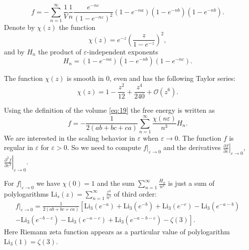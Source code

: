 \documentclass{article}
\newcommand{\Li}{\mathrm{Li}}
\begin{document}
\begin{equation}
  \label{eq:38}
  f=-\sum_{n=1}^{\infty}
  \frac{1}{V}\frac{1}{n}\frac{e^{-n\varepsilon}}{\left(1-e^{-n\varepsilon}\right)^{2}}
  \left(1-e^{-na}\right)\left(1-e^{-nb}\right)\left(1-e^{-nb}\right).
\end{equation}
Denote by $\chi(z)$ the function
\begin{equation}
  \label{eq:39}
  \chi(z)=e^{-z}\left(\frac{z}{1-e^{-z}}\right)^{2}, 
\end{equation}
and by $H_{n}$ the product of $\varepsilon$-independent exponents
\begin{equation}
  \label{eq:40}
  H_{n}=\left(1-e^{-na}\right)\left(1-e^{-nb}\right)\left(1-e^{-nc}\right).
\end{equation}

The function $\chi(z)$ is smooth in 0, even and has the following Taylor series:
\begin{equation}
  \label{eq:45}
  \chi(z)=1 - \frac{z^2}{12} + \frac{z^4}{240}+\mathcal{O}(z^{6}).
\end{equation}

Using the definition of the volume \eqref{eq:19} the free energy is written as
\begin{equation}
  \label{eq:41}
  f=-\frac{1}{2(ab+bc+ca)} \sum _{n=1}^{\infty} \frac{\chi(n\varepsilon)}{n^{3}} H_{n}.
\end{equation}
We are interested in the scaling behavior in $\varepsilon$ when $\varepsilon\to 0$. The function $f$
is regular in $\varepsilon$ for $\varepsilon>0$. So we need to
compute  $\left.f\right|_{\varepsilon\to 0}$ and the derivatives $\left.\frac{\partial f}{\partial
  \varepsilon}\right|_{\varepsilon\to 0}$, $\left.\frac{\partial^{2} f}{\partial
  \varepsilon^{2}}\right|_{\varepsilon\to 0}$.

For $\left.f\right|_{\varepsilon\to 0}$ we have $\chi(0)=1$ and the sum $\sum_{n=1}^{\infty}
\frac{H_{n}}{n^{3}}$ is just a sum of  polylogarithms
$\mathrm{Li}_{s}(z)=\sum_{n=1}^{\infty}\frac{z^{n}}{n^{s}}$ of third order:
\begin{multline}
  \label{eq:42}
  \left.f\right|_{\varepsilon\to 0} =\frac{1}{2(ab+bc+ca)}\left[\Li_{3}(e^{-a})+\Li_{3}(e^{-b})+\Li_{3}(e^{-c})-
    \Li_{3}(e^{-a-b})\right.\\
  \left.-\Li_{3}(e^{-b-c})-    \Li_{3}(e^{-a-c})+    \Li_{3}(e^{-a-b-c})-\zeta(3)\right].
\end{multline}
Here Riemann zeta function appears as a particular value of polylogarithm $\Li_{3}(1)=\zeta(3)$.
\end{document}
